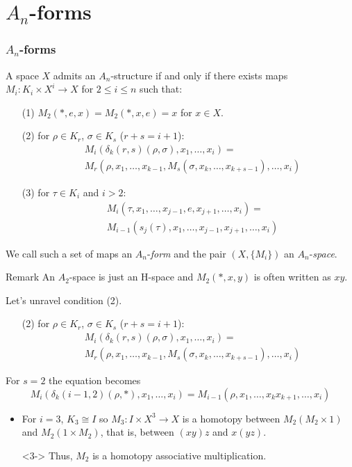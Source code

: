 \documentclass{beamer}
\theoremstyle{definition}
\begin{document}
\section{$A_n$-forms}
\begin{frame}
\frametitle{$A_n$-forms}
\begin{theorem}
A space $X$ admits an $A_n$-structure if and only if there exists maps $M_i:K_i\times X^i\to X$ for $2\leq i\leq n$ such that:
\begin{itemize}
\item[(1)] $M_2(*,e,x)=M_2(*,x,e)=x$ for $x\in X$. %
\item[(2)] for $\rho\in K_r$, $\sigma\in K_s$ ($r+s=i+1$):
\begin{align*}
&M_i(\delta_k(r,s)(\rho,\sigma),x_1,\dots, x_i)=\\
&M_r(\rho,x_1,\dots, x_{k-1},M_s(\sigma,x_k,\dots, x_{k+s-1}),\dots, x_i)
\end{align*} %
\item[(3)] for $\tau\in K_i$ and $i>2$:
\begin{align*}
&M_i(\tau,x_1,\dots, x_{j-1},e,x_{j+1},\dots, x_i)=\\
&M_{i-1}(s_j(\tau),x_1,\dots, x_{j-1},x_{j+1},\dots, x_i)
\end{align*}%
\end{itemize}
\end{theorem}
\end{frame}

\begin{frame}
We call such a set of maps an $A_n$-\emph{form} and the pair $(X,\{M_i\})$ an $A_n$-\emph{space}.\pause
\begin{block}{Remark}
An $A_2$-space is just an H-space and $M_2(*,x,y)$ is often written as $xy$.
\end{block}\pause
Let's unravel condition (2).\pause
\begin{itemize}
\item[(2)] for $\rho\in K_r$, $\sigma\in K_s$ ($r+s=i+1$):
\begin{align*}
&M_i(\delta_k(r,s)(\rho,\sigma),x_1,\dots, x_i)=\\
&M_r(\rho,x_1,\dots, x_{k-1},M_s(\sigma,x_k,\dots, x_{k+s-1}),\dots, x_i)
\end{align*} %
\end{itemize}
\end{frame}
\begin{frame}
For $s=2$ the equation becomes
\[
M_i(\delta_k(i-1,2)(\rho,*),x_1,\dots, x_i)=M_{i-1}(\rho,x_1,\dots,x_kx_{k+1},\dots, x_i)
\]
\begin{itemize}
\item<2-> For $i=3$, $K_3\cong I$ so $M_3:I\times X^3\to X$ is a homotopy between $M_2(M_2\times 1)$ and $M_2(1\times M_2)$, that is, between $(xy)z$ and $x(yz)$.
\item[]<3-> Thus, $M_2$ is a homotopy associative multiplication.
\end{itemize}

\end{frame}
\end{document}
